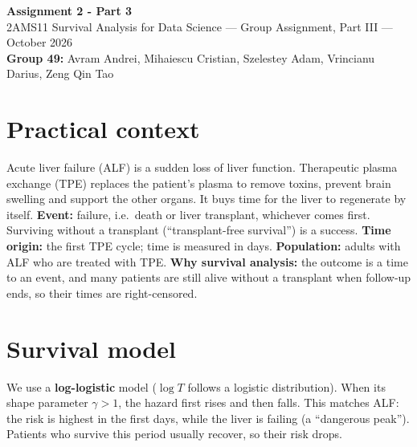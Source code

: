 \documentclass[10pt,a4paper]{article}
\begin{document}
\begin{center}
{\large\bfseries Assignment 2 - Part 3}\\[3pt]
{\small 2AMS11 Survival Analysis for Data Science --- Group Assignment, Part III --- October 2026}\\[1pt]
{\small\textbf{Group 49:} Avram Andrei, Mihaiescu Cristian, Szelestey Adam, Vrincianu Darius, Zeng Qin Tao}
\end{center}
\vspace{-8pt}

\section{Practical context}
Acute liver failure (ALF) is a sudden loss of liver function. Therapeutic plasma exchange (TPE) replaces the patient's plasma to remove toxins, prevent brain swelling and support the other organs. It buys time for the liver to regenerate by itself.
\textbf{Event:} failure, i.e.\ death or liver transplant, whichever comes first. Surviving without a transplant (``transplant-free survival'') is a success.
\textbf{Time origin:} the first TPE cycle; time is measured in days.
\textbf{Population:} adults with ALF who are treated with TPE.
\textbf{Why survival analysis:} the outcome is a time to an event, and many patients are still alive without a transplant when follow-up ends, so their times are right-censored.

\section{Survival model}
We use a \textbf{log-logistic} model ($\log T$ follows a logistic distribution). When its shape parameter $\gamma>1$, the hazard first rises and then falls. This matches ALF: the risk is highest in the first days, while the liver is failing (a ``dangerous peak''). Patients who survive this period usually recover, so their risk drops.
\end{document}
